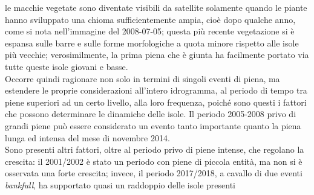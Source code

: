 le macchie vegetate sono diventate visibili da satellite solamente quando le piante hanno sviluppato una chioma sufficientemente ampia, cioè dopo qualche anno, come si nota nell'immagine del 2008-07-05;
questa più recente vegetazione si è espansa sulle barre e sulle forme morfologiche a quota minore rispetto alle isole più vecchie;
verosimilmente, la prima piena che è giunta ha facilmente portato via tutte queste isole giovani e basse.
\\
Occorre quindi ragionare non solo in termini di singoli eventi di piena, ma estendere le proprie considerazioni all'intero idrogramma, al periodo di tempo tra piene superiori ad un certo livello, alla loro frequenza, poiché sono questi i fattori che possono determinare le dinamiche delle isole.
Il periodo 2005-2008 privo di grandi piene può essere considerato un evento tanto importante quanto la piena lunga ed intensa del mese di novembre 2014.
\\
Sono presenti altri fattori, oltre al periodo privo di piene intense, che regolano la crescita: il 2001/2002 è stato un periodo con piene di piccola entità, ma non si è osservata una forte crescita; invece, il periodo 2017/2018, a cavallo di due eventi \emph{bankfull}, ha supportato quasi un raddoppio delle isole presenti

